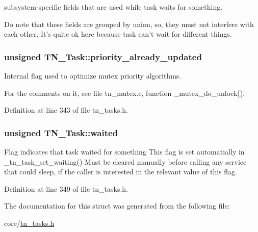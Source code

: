 subsystem-\/specific fields that are used while task waits for something. 

Do note that these fields are grouped by union, so, they must not interfere with each other. It's quite ok here because task can't wait for different things. \hypertarget{structTN__Task_abb4d22974c7317dd610f646b9048656d}{
\subsubsection[{priority\+\_\+already\+\_\+updated}]{\setlength{\rightskip}{0pt plus 5cm}unsigned T\+N\+\_\+\+Task\+::priority\+\_\+already\+\_\+updated}}\label{structTN__Task_abb4d22974c7317dd610f646b9048656d}


Internal flag used to optimize mutex priority algorithms. 

For the comments on it, see file tn\+\_\+mutex.\+c, function {\ttfamily \+\_\+mutex\+\_\+do\+\_\+unlock()}. 

Definition at line 343 of file tn\+\_\+tasks.\+h.

\hypertarget{structTN__Task_a47c3a0a27be1ee526a1599a2ca8bb269}{
\subsubsection[{waited}]{\setlength{\rightskip}{0pt plus 5cm}unsigned T\+N\+\_\+\+Task\+::waited}}\label{structTN__Task_a47c3a0a27be1ee526a1599a2ca8bb269}


Flag indicates that task waited for something This flag is set automatially in {\ttfamily \+\_\+tn\+\_\+task\+\_\+set\+\_\+waiting()} Must be cleared manually before calling any service that could sleep, if the caller is interested in the relevant value of this flag. 



Definition at line 349 of file tn\+\_\+tasks.\+h.



The documentation for this struct was generated from the following file\+:\begin{DoxyCompactItemize}
\item 
core/\hyperlink{tn__tasks_8h}{tn\+\_\+tasks.\+h}\end{DoxyCompactItemize}
